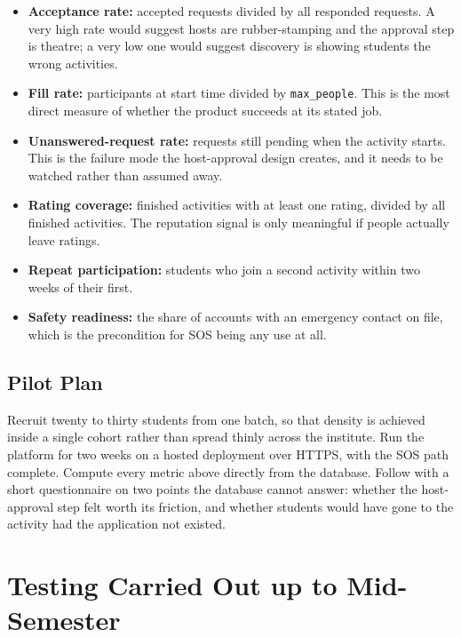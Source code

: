 \documentclass{tietreport}
\begin{document}
\begin{itemize}
  \item \textbf{Acceptance rate:} accepted requests divided by all responded requests.
        A very high rate would suggest hosts are rubber-stamping and the approval step
        is theatre; a very low one would suggest discovery is showing students the wrong
        activities.
  \item \textbf{Fill rate:} participants at start time divided by \texttt{max\_people}.
        This is the most direct measure of whether the product succeeds at its stated
        job.
  \item \textbf{Unanswered-request rate:} requests still pending when the activity
        starts. This is the failure mode the host-approval design creates, and it needs
        to be watched rather than assumed away.
  \item \textbf{Rating coverage:} finished activities with at least one rating, divided
        by all finished activities. The reputation signal is only meaningful if people
        actually leave ratings.
  \item \textbf{Repeat participation:} students who join a second activity within two
        weeks of their first.
  \item \textbf{Safety readiness:} the share of accounts with an emergency contact on
        file, which is the precondition for SOS being any use at all.
\end{itemize}

\subsection{Pilot Plan}

Recruit twenty to thirty students from one batch, so that density is achieved inside a
single cohort rather than spread thinly across the institute. Run the platform for two
weeks on a hosted deployment over HTTPS, with the SOS path complete. Compute every
metric above directly from the database. Follow with a short questionnaire on two
points the database cannot answer: whether the host-approval step felt worth its
friction, and whether students would have gone to the activity had the application not
existed.

\section{Testing Carried Out up to Mid-Semester}
\end{document}
